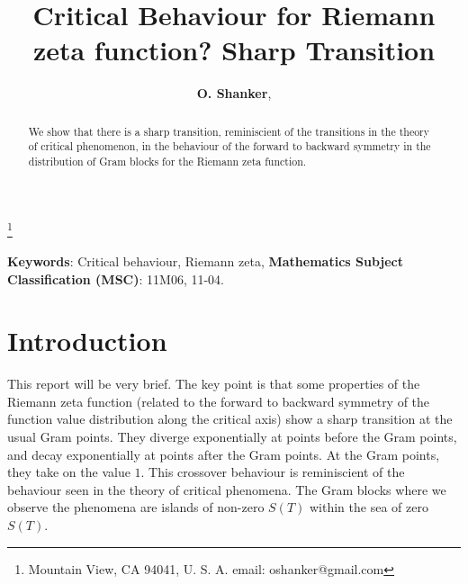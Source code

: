 \documentclass[twoside]{article}
\begin{document}


\newtheorem{theorem}{Theorem}[section]
\newtheorem{lemma}[theorem]{Lemma}

\theoremstyle{definition}
\newtheorem{definition}[theorem]{Definition}
\newtheorem{example}[theorem]{Example}
\newtheorem{xca}[theorem]{Exercise}

\theoremstyle{remark}
\newtheorem{remark}[theorem]{Remark}



\date{}
\lhead[]{}
\rhead[]{}

\title{\bf{Critical Behaviour for Riemann zeta function? Sharp Transition}}

\maketitle


\author{{\textbf{O. Shanker}},}
\thanks{ Mountain View, CA 94041, U. S. A. email: oshanker@gmail.com}

\thispagestyle{fancy}

\begin{abstract}
We show that there is a sharp transition, reminiscient of the transitions in the theory of
critical phenomenon, in the behaviour of the forward to backward symmetry in the distribution
of Gram blocks for the Riemann zeta function.

\end{abstract}
{\textbf {Keywords}:} Critical behaviour, Riemann zeta,  
{\textbf {Mathematics Subject Classification (MSC)}:} 11M06, 11-04.


\symbolfootnote[0]{*}


\section{Introduction}

This report will be very brief. The key point is that some properties of the Riemann zeta function (related to the forward to backward symmetry of the function value distribution along the critical axis) show a sharp transition at the usual Gram points. They diverge exponentially at points before the Gram points, and decay exponentially at points after the Gram points. At the Gram points, they take on the value $1$. This crossover behaviour is reminiscient of the behaviour seen in the theory of critical phenomena.  The Gram blocks where we observe the phenomena are islands of non-zero $S(T)$ within the sea of zero $S(T)$.
\end{document}
